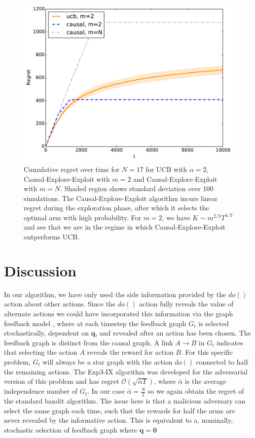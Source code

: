 \documentclass{article}
\newcommand{\bigo}[1]{\mathcal{O}\left( #1 \right)}
\theoremstyle{plain}
\theoremstyle{definition}
\begin{document}
\begin{figure}
\caption{Cumulative regret over time for $N = 17$ for UCB with $\alpha=2$, Causal-Explore-Exploit with $m=2$ and Causal-Explore-Exploit with $m=N$. Shaded region shows standard deviation over 100 simulations. The Causal-Explore-Exploit algorithm incurs linear regret during the exploration phase, after which it selects the optimal arm with high probability. For $m=2$, we have $K \sim m^{2/3}T^{1/3}$ and see that we are in the regime in which Causal-Explore-Exploit outperforms UCB.}
\label{fig:known_q_r_vs_t}
\centering
\includegraphics[width=.5\textwidth]{exp_regret_vs_t_T10000_N17_sims100_20151229_120647.pdf}
\end{figure}


\section{Discussion}


In our algorithm, we have only used the side information provided by the $do()$ action about other actions. Since the $do()$ action fully reveals the value of alternate actions we could have incorporated this information via the graph feedback model \cite{Mannor2011}, where at each timestep the feedback graph $G_t$ is selected stochastically, dependent on $\boldsymbol{q}$, and revealed after an action has been chosen. The feedback graph is distinct from the causal graph. A link $A \rightarrow B$ in $G_t$ indicates that selecting the action $A$ reveals the reward for action $B$. For this specific problem, $G_t$ will always be a star graph with the action $do()$ connected to half the remaining actions. The Exp3-IX algorithm \cite{Kocak2014} was developed for the adversarial version of this problem and has regret $\bigo{\sqrt{\bar{\alpha}T}}$, where $\bar{\alpha}$ is the average independence number of $G_t$. In our case $\bar{\alpha} = \frac{N}{2}$ so we again obtain the regret of the standard bandit algorithm. The issue here is that a malicious adversary can select the same graph each time, such that the rewards for half the arms are never revealed by the informative action. This is equivalent to a, nominally, stochastic selection of feedback graph where $\boldsymbol{q} = \boldsymbol{0}$
\end{document}
